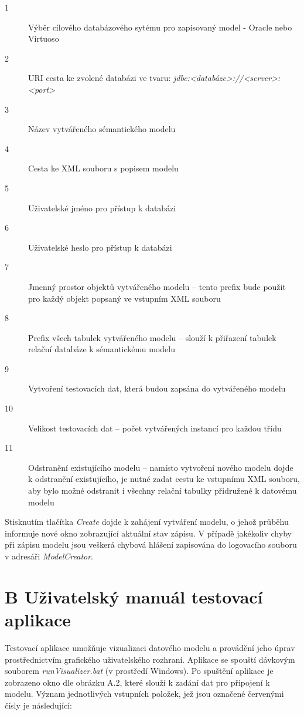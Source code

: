 \documentclass{projekt}
\begin{document}
\begin{description}
\item[1] Výběr cílového databázového sytému pro zapisovaný model - Oracle nebo 
Virtuoso
\item[2] URI cesta ke zvolené databázi ve tvaru: {\it jdbc:<databáze>://<server>:<port>}
\item[3] Název vytvářeného sémantického modelu
\item[4] Cesta ke XML souboru s popisem modelu
\item[5] Uživatelské jméno pro přístup k databázi
\item[6] Uživatelské heslo pro přístup k databázi
\item[7] Jmenný prostor objektů vytvářeného modelu – tento prefix bude použit pro každý objekt popsaný ve vstupním XML souboru
\item[8] Prefix všech tabulek vytvářeného modelu – slouží k přiřazení tabulek relační databáze k sémantickému modelu
\item[9] Vytvoření testovacích dat, která budou zapsána do vytvářeného modelu
\item[10] Velikost testovacích dat – počet vytvářených instancí pro každou třídu
\item[11] Odstranění existujícího modelu – namísto vytvoření nového modelu dojde k odstranění existujícího, je nutné zadat cestu ke vstupnímu XML souboru, aby bylo možné odstranit i všechny relační tabulky přidružené k datovému modelu
\end{description}

\thispagestyle{plain}

Stisknutím tlačítka {\it Create} dojde k zahájení vytváření modelu, o jehož průběhu informuje nové okno zobrazující aktuální stav zápisu. V případě jakékoliv chyby při zápisu modelu jsou veškerá chybová hlášení zapisována do logovacího souboru v adresáři {\it ModelCreator}.


\newpage
\thispagestyle{plain}
\section*{{\LARGE B} Uživatelský manuál testovací aplikace}
\hspace{0.65cm}Testovací aplikace umožňuje vizualizaci datového modelu a provádění jeho úprav prostřednictvím grafického uživatelského rozhraní. Aplikace se spouští dávkovým souborem {\it runVisualizer.bat} (v prostředí Windows). Po spuštění aplikace je zobrazeno okno dle obrázku A.2, které slouží k zadání dat pro připojení k modelu. Význam jednotlivých vstupních položek, jež jsou označené červenými čísly je následující:
\end{document}
